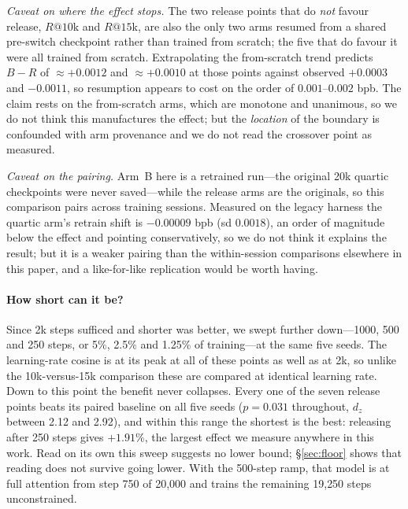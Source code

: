 \documentclass[11pt,a4paper]{article}
\begin{document}
\emph{Caveat on where the effect stops.} The two release points that do \emph{not} favour release, $R@10$k and $R@15$k, are also the only two arms resumed from a shared pre-switch checkpoint rather than trained from scratch; the five that do favour it were all trained from scratch. Extrapolating the from-scratch trend predicts $B-R$ of ${\approx}+0.0012$ and ${\approx}+0.0010$ at those points against observed $+0.0003$ and $-0.0011$, so resumption appears to cost on the order of $0.001$--$0.002$ bpb. The claim rests on the from-scratch arms, which are monotone and unanimous, so we do not think this manufactures the effect; but the \emph{location} of the boundary is confounded with arm provenance and we do not read the crossover point as measured.

\emph{Caveat on the pairing.} Arm~B here is a retrained run---the original 20k quartic checkpoints were never saved---while the release arms are the originals, so this comparison pairs across training sessions. Measured on the legacy harness the quartic arm's retrain shift is $-0.00009$ bpb (sd $0.0018$), an order of magnitude below the effect and pointing conservatively, so we do not think it explains the result; but it is a weaker pairing than the within-session comparisons elsewhere in this paper, and a like-for-like replication would be worth having.

\paragraph{How short can it be?} Since 2k steps sufficed and shorter was better, we swept further down---1000, 500 and 250 steps, or 5\%, 2.5\% and 1.25\% of training---at the same five seeds. The learning-rate cosine is at its peak at all of these points as well as at 2k, so unlike the 10k-versus-15k comparison these are compared at identical learning rate. Down to this point the benefit never collapses. Every one of the seven release points beats its paired baseline on all five seeds ($p=0.031$ throughout, $d_z$ between 2.12 and 2.92), and within this range the shortest is the best: releasing after 250 steps gives $+1.91$\%, the largest effect we measure anywhere in this work. Read on its own this sweep suggests no lower bound; \S\ref{sec:floor} shows that reading does not survive going lower. With the 500-step ramp, that model is at full attention from step 750 of 20{,}000 and trains the remaining 19{,}250 steps unconstrained.
\end{document}
